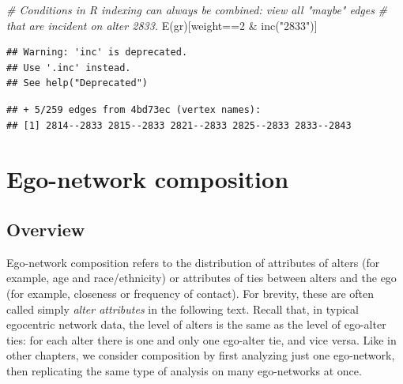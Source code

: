 \documentclass[
]{book}
\newenvironment{Shaded}{\begin{snugshade}}{\end{snugshade}}
\newcommand{\CommentTok}[1]{\textcolor[rgb]{0.56,0.35,0.01}{\textit{#1}}}
\newcommand{\DecValTok}[1]{\textcolor[rgb]{0.00,0.00,0.81}{#1}}
\newcommand{\FunctionTok}[1]{\textcolor[rgb]{0.00,0.00,0.00}{#1}}
\newcommand{\NormalTok}[1]{#1}
\newcommand{\SpecialCharTok}[1]{\textcolor[rgb]{0.00,0.00,0.00}{#1}}
\newcommand{\StringTok}[1]{\textcolor[rgb]{0.31,0.60,0.02}{#1}}
\begin{document}
\begin{Shaded}
\begin{Highlighting}[]
\CommentTok{\# Conditions in R indexing can always be combined: view all "maybe" edges}
\CommentTok{\# that are incident on alter 2833.}
\FunctionTok{E}\NormalTok{(gr)[weight}\SpecialCharTok{==}\DecValTok{2} \SpecialCharTok{\&} \FunctionTok{inc}\NormalTok{(}\StringTok{"2833"}\NormalTok{)]}
\end{Highlighting}
\end{Shaded}

\begin{verbatim}
## Warning: 'inc' is deprecated.
## Use '.inc' instead.
## See help("Deprecated")
\end{verbatim}

\begin{verbatim}
## + 5/259 edges from 4bd73ec (vertex names):
## [1] 2814--2833 2815--2833 2821--2833 2825--2833 2833--2843
\end{verbatim}

\begin{Shaded}
\end{Shaded}

\hypertarget{composition}{%
\chapter{Ego-network composition}\label{composition}}

\hypertarget{overview-2}{%
\section{Overview}\label{overview-2}}

Ego-network composition refers to the distribution of attributes of alters (for example, age and race/ethnicity) or attributes of ties between alters and the ego (for example, closeness or frequency of contact). For brevity, these are often called simply \emph{alter attributes} in the following text. Recall that, in typical egocentric network data, the level of alters is the same as the level of ego-alter ties: for each alter there is one and only one ego-alter tie, and vice versa. Like in other chapters, we consider composition by first analyzing just one ego-network, then replicating the same type of analysis on many ego-networks at once.
\end{document}

